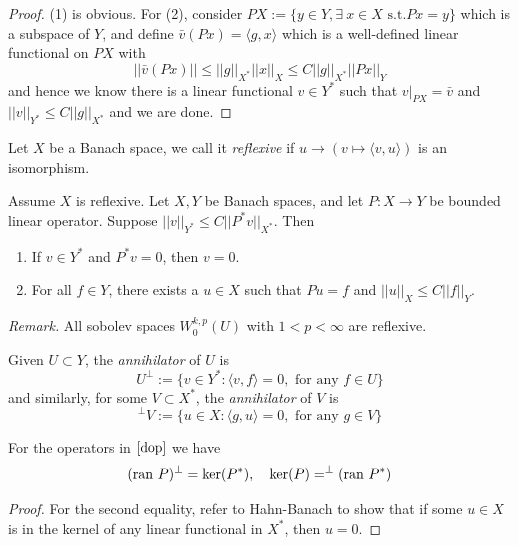\begin{proof}
    (1) is obvious. For (2), consider $PX:=\{y\in Y,\exists\  x\in X\text{ s.t.} Px=y\}$ which is a subspace of $Y$, and define $\bar{v}(Px) = \langle g,x\rangle$ which is a well-defined linear functional on $PX$ with
    \[
    ||\bar{v}(Px)|| \leq ||g||_{X^*}||x||_X \leq C||g||_{X^*}||Px||_Y
    \]
    and hence we know there is a linear functional $v \in Y^*$ such that $v|_{PX} = \bar{v}$ and $||v||_{Y^*} \leq C||g||_{X^*}$ and we are done.
\end{proof}


\begin{definition}
    Let $X$ be a Banach space, we call it \emph{reflexive} if $u\to(v\mapsto\langle v,u \rangle)$ is an isomorphism.
\end{definition}

\begin{proposition}
    Assume $X$ is reflexive. Let $X,Y$ be Banach spaces, and let $P:X\to Y$ be bounded linear operator. Suppose $||v||_{Y^{*}} \leq C||P^*v||_{X^*}$. Then
    \begin{enumerate}
        \item If $v \in Y^*$ and $P^*v = 0$, then $v = 0$.
        \item For all $f\in Y$, there exists a $u\in X$ such that $Pu = f$ and $||u||_X \leq C||f||_Y$.
    \end{enumerate}
\end{proposition}

\emph{Remark.} All sobolev spaces $W^{k,p}_0(U)$ with $1 < p < \infty$ are reflexive.

\begin{definition}
    Given $U\subset Y$, the \emph{annihilator} of $U$ is
    \[
    U^{\perp}:=\{v\in Y^*:\langle v,f\rangle = 0,\text{ for any }f\in U\}
    \]
    and similarly, for some $V\subset X^*$, the \emph{annihilator} of $V$ is
    \[
    ^{\perp}V:=\{u\in X:\langle g,u\rangle = 0,\text{ for any }g\in V\}
    \]
\end{definition}

\begin{proposition}
    For the operators in $\eqref{dop}$ we have 
    \[
    (\text{ran}\ {P})^{\perp} = \ker(P^*),\quad \ker(P) = ^\perp(\text{ran}\ {P^*})
    \]
\end{proposition}
\begin{proof}
    For the second equality, refer to Hahn-Banach to show that if some $u\in X$ is in the kernel of any linear functional in $X^*$, then $u = 0$.
\end{proof}

